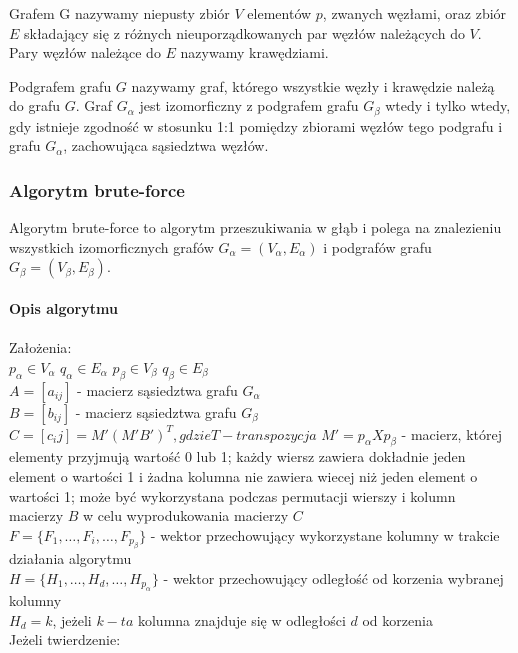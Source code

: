 \documentclass[a4paper,12pt]{article}
\begin{document}
Grafem G nazywamy niepusty zbiór $V$ elementów $p$, zwanych węzłami, oraz zbiór $E$ składający się z różnych nieuporządkowanych par węzłów należących do $V$. Pary węzłów należące do $E$ nazywamy krawędziami.

Podgrafem grafu $G$ nazywamy graf, którego wszystkie węzły i krawędzie należą do grafu $G$. Graf $G_\alpha$ jest izomorficzny z podgrafem grafu $G_\beta$ wtedy i tylko wtedy, gdy istnieje zgodność w stosunku 1:1 pomiędzy zbiorami węzłów tego podgrafu i grafu $G_\alpha$, zachowująca sąsiedztwa węzłów\cite{ullmann}.

\subsubsection{Algorytm brute-force}

Algorytm brute-force to algorytm przeszukiwania w głąb i polega na znalezieniu wszystkich izomorficznych grafów $G_\alpha = (V_\alpha, E_\alpha)$ i podgrafów grafu $G_\beta = (V_\beta, E_\beta)$.
\\ \\
\textbf{Opis algorytmu}
\\ \\
Założenia\cite{ullmann}: \\
$p_\alpha \in V_\alpha$ \hspace{20} 
$q_\alpha \in E_\alpha$ \hspace{20} 
$p_\beta \in V_\beta$   \hspace{20}
$q_\beta \in E_\beta$ \\
$A = [a_{ij}]$ - macierz sąsiedztwa grafu $G_\alpha$ \\
$B = [b_{ij}]$ - macierz sąsiedztwa grafu $G_\beta$
$C = [c_ij] = M'(M'B')^T, gdzie T - transpozycja$
$M' = p_\alpha X p_\beta$ - macierz, której elementy przyjmują wartość 0 lub 1; każdy wiersz zawiera dokładnie jeden element o wartości 1 i żadna kolumna nie zawiera wiecej niż jeden element o wartości 1; może być wykorzystana podczas permutacji wierszy i kolumn macierzy $B$ w celu wyprodukowania macierzy $C$ \\
$F = \{ F_1, \ldots, F_i, \ldots, F_{p_\beta} \}$ - wektor przechowujący wykorzystane kolumny w trakcie działania algorytmu \\
$H = \{ H_1, \ldots, H_d, \ldots, H_{p_\alpha} \}$ - wektor przechowujący odległość od korzenia wybranej kolumny \\
$H_d = k$, jeżeli $k-ta$ kolumna znajduje się w odległości $d$ od korzenia
\\
Jeżeli twierdzenie:
\end{document}
